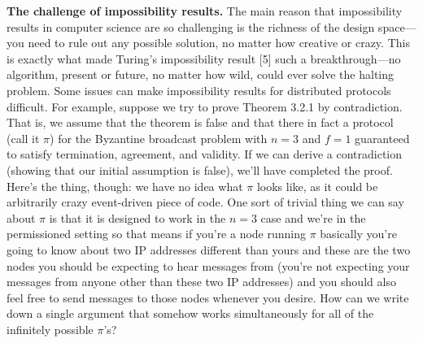 \noindent
\textbf{The challenge of impossibility results.} The main reason that impossibility results in
computer science are so challenging is the richness of the design space—you need to rule
out any possible solution, no matter how creative or crazy. This is exactly what made
Turing’s impossibility result [5] such a breakthrough—no algorithm, present or future, no
matter how wild, could ever solve the halting problem.
Some issues can make impossibility results for distributed protocols difficult.
For example, suppose we try to prove Theorem 3.2.1 by contradiction. That is, we assume
that the theorem is false and that there in fact a protocol (call it $\pi$) for the Byzantine
broadcast problem with $n = 3$ and $f = 1$ guaranteed to satisfy termination, agreement, and
validity. If we can derive a contradiction (showing that our initial assumption is false), we’ll
have completed the proof. Here’s the thing, though: we have no idea what $\pi$ looks like, as
it could be arbitrarily crazy event-driven piece of code. One sort of trivial thing we can
say about $\pi$ is that it is designed to work in the $n = 3$ case and we're in the permissioned setting so that means if you're a node running $\pi$ basically you're going to know about two IP addresses different than yours
and these are the two nodes you should be expecting to hear messages from (you're not expecting your messages from anyone other than these two IP addresses)
and you should also feel free to send messages to those nodes whenever you desire. How can we write down a single
argument that somehow works simultaneously for all of the infinitely possible $\pi$’s?\\

